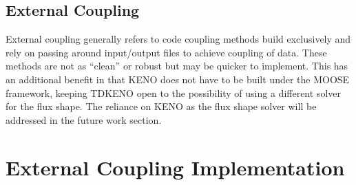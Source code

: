 \documentclass[11pt]{article}
\begin{document}
\subsection{External Coupling}
External coupling generally refers to code coupling methods build exclusively and rely on passing around input/output files to achieve coupling of data.  These methods are not as “clean” or robust but may be quicker to implement. This has an additional benefit in that KENO does not have to be built under the MOOSE framework, keeping TDKENO open to the possibility of using a different solver for the flux shape.  The reliance on KENO as the flux shape solver will be addressed in the future work section. 

\section{External Coupling Implementation}
\end{document}

